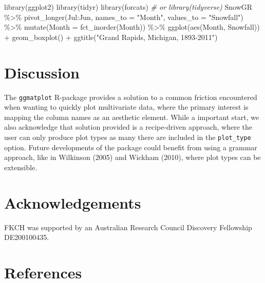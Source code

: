 \documentclass[10pt,a4paper,onecolumn]{article}
\newenvironment{Shaded}{\begin{snugshade}}{\end{snugshade}}
\newcommand{\AttributeTok}[1]{\textcolor[rgb]{0.77,0.63,0.00}{#1}}
\newcommand{\CommentTok}[1]{\textcolor[rgb]{0.56,0.35,0.01}{\textit{#1}}}
\newcommand{\FunctionTok}[1]{\textcolor[rgb]{0.00,0.00,0.00}{#1}}
\newcommand{\NormalTok}[1]{#1}
\newcommand{\SpecialCharTok}[1]{\textcolor[rgb]{0.00,0.00,0.00}{#1}}
\newcommand{\StringTok}[1]{\textcolor[rgb]{0.31,0.60,0.02}{#1}}
\begin{document}
\begin{Shaded}
\begin{Highlighting}[]
\FunctionTok{library}\NormalTok{(ggplot2)}
\FunctionTok{library}\NormalTok{(tidyr) }
\FunctionTok{library}\NormalTok{(forcats) }\CommentTok{\# or library(tidyverse)}
\NormalTok{SnowGR }\SpecialCharTok{\%\textgreater{}\%} 
  \FunctionTok{pivot\_longer}\NormalTok{(Jul}\SpecialCharTok{:}\NormalTok{Jun, }
               \AttributeTok{names\_to =} \StringTok{"Month"}\NormalTok{,}
               \AttributeTok{values\_to =} \StringTok{"Snowfall"}\NormalTok{) }\SpecialCharTok{\%\textgreater{}\%} 
  \FunctionTok{mutate}\NormalTok{(}\AttributeTok{Month =} \FunctionTok{fct\_inorder}\NormalTok{(Month)) }\SpecialCharTok{\%\textgreater{}\%} 
  \FunctionTok{ggplot}\NormalTok{(}\FunctionTok{aes}\NormalTok{(Month, Snowfall)) }\SpecialCharTok{+} 
  \FunctionTok{geom\_boxplot}\NormalTok{() }\SpecialCharTok{+} 
  \FunctionTok{ggtitle}\NormalTok{(}\StringTok{"Grand Rapids, Michigan, 1893{-}2011"}\NormalTok{)}
\end{Highlighting}
\end{Shaded}

\hypertarget{discussion}{%
\section{Discussion}\label{discussion}}

The \texttt{ggmatplot} R-package provides a solution to a common
friction encountered when wanting to quickly plot multivariate data,
where the primary interest is mapping the column names as an aesthetic
element. While a important start, we also acknowledge that solution
provided is a recipe-driven approach, where the user can only produce
plot types as many there are included in the \texttt{plot\_type} option.
Future developments of the package could benefit from using a grammar
approach, like in Wilkinson (2005) and Wickham (2010), where plot types
can be extensible.

\hypertarget{acknowledgements}{%
\section{Acknowledgements}\label{acknowledgements}}

FKCH was supported by an Australian Research Council Discovery
Fellowship DE200100435.

\hypertarget{references}{%
\section*{References}\label{references}}
\end{document}
